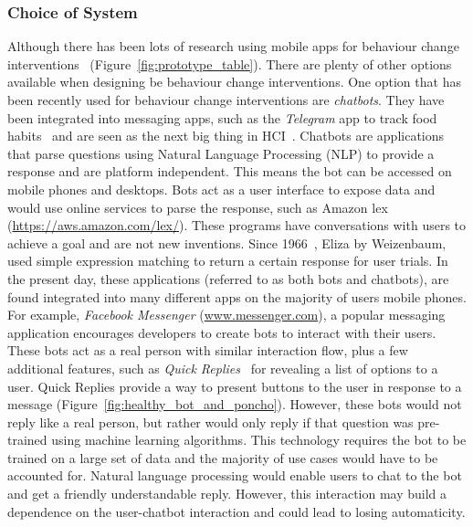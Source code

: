 \subsubsection*{Choice of System}
Although there has been lots of research using mobile apps for behaviour change interventions~\cite{survey_on_current_apps_of_steel} (Figure~\ref{fig:prototype_table}). There are plenty of other options available when designing be behaviour change interventions. One option that has been recently used for behaviour change interventions are \textit{chatbots}. They have been integrated into messaging apps, such as the \textit{Telegram} app to track food habits~\cite{telegram_bot_tracking_habits} and are seen as the next big thing in HCI~\cite{chatbots_and_new_world_of_hci}. Chatbots are applications that parse questions using Natural Language Processing (NLP) to provide a response and are platform independent. This means the bot can be accessed on mobile phones and desktops. Bots act as a user interface to expose data and would use online services to parse the response, such as Amazon lex (\url{https://aws.amazon.com/lex/}). These programs have conversations with users to achieve a goal and are not new inventions. Since 1966~\cite{article_eliza}, Eliza by Weizenbaum, used simple expression matching to return a certain response for user trials. In the present day, these applications (referred to as both bots and chatbots), are found integrated into many different apps on the majority of users mobile phones. For example, \textit{Facebook Messenger} (\url{www.messenger.com}), a popular messaging application encourages developers to create bots to interact with their users. These bots act as a real person with similar interaction flow, plus a few additional features, such as \textit{Quick Replies}~\cite{doc_fb_quick_replies} for revealing a list of options to a user. Quick Replies provide a way to present buttons to the user in response to a message (Figure~\ref{fig:healthy_bot_and_poncho}). However, these bots would not reply like a real person, but rather would only reply if that question was pre-trained using machine learning algorithms. This technology requires the bot to be trained on a large set of data and the majority of use cases would have to be accounted for. Natural language processing would enable users to chat to the bot and get a friendly understandable reply. However, this interaction may build a dependence on the user-chatbot interaction and could lead to losing automaticity.

